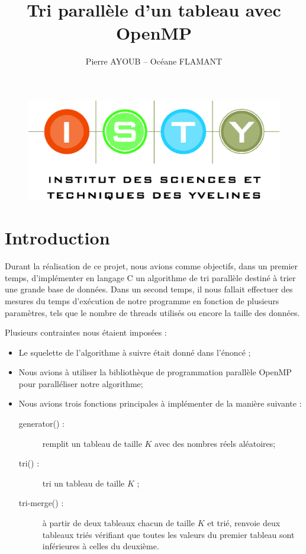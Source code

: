 \documentclass[12pt]{article}
\begin{document}
\title{Tri parallèle d'un tableau avec OpenMP}
\author{Pierre AYOUB -- Océane FLAMANT}

\maketitle

\begin{figure}[b]
    \centering
    \includegraphics[scale=0.3]{pictures/isty.jpg}
\end{figure}

\tableofcontents

\section{Introduction}

Durant la réalisation de ce projet, nous avions comme objectifs, dans un premier
temps, d'implémenter en langage C un algorithme de tri parallèle destiné à trier
une grande base de données. Dans un second temps, il nous fallait effectuer des
mesures du temps d'exécution de notre programme en fonction de plusieurs
paramètres, tels que le nombre de threads utilisés ou encore la taille des données.

Plusieurs contraintes nous étaient imposées :
\begin{itemize}  
    \item{Le squelette de l'algorithme à suivre était donné dans l'énoncé ;}
    \item{Nous avions à utiliser la bibliothèque de programmation parallèle OpenMP pour paralléliser notre algorithme;}
    \item{Nous avions trois fonctions principales à implémenter de la manière suivante :}
        \begin{description}
            \item[generator() :] {remplit un tableau de taille $K$ avec des nombres réels aléatoires;}
            \item[tri() :] {tri un tableau de taille $K$ ;}
            \item[tri-merge() :] {à partir de deux tableaux chacun de taille $K$ et trié, renvoie deux tableaux triés vérifiant que toutes les valeurs du premier tableau sont inférieures à celles du deuxième.}
        \end{description}
\end{itemize}
\end{document}
